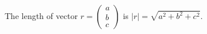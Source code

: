 The length of vector 
$ r = \left ( 
\begin{array}{c} 
  a \\
  b \\
  c 
\end{array} 
\right ) $
is $ | r | = \sqrt{a^2 + b^2 + c^2} . $